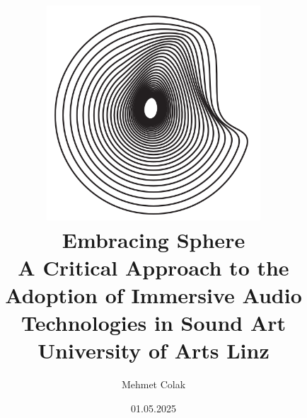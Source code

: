 \begin{titlepage}
  
    \author{Mehmet Colak}
    \title{\includegraphics[width = 80mm]{images/logo_embrace_sphere.png}\\[5ex]  Embracing Sphere\\[1ex] 
    \Large A Critical Approach to the Adoption of Immersive Audio Technologies in Sound Art\\[3ex]
    \large University of Arts Linz\\[6ex]}
    \date{01.05.2025}

\end{titlepage}

\maketitle